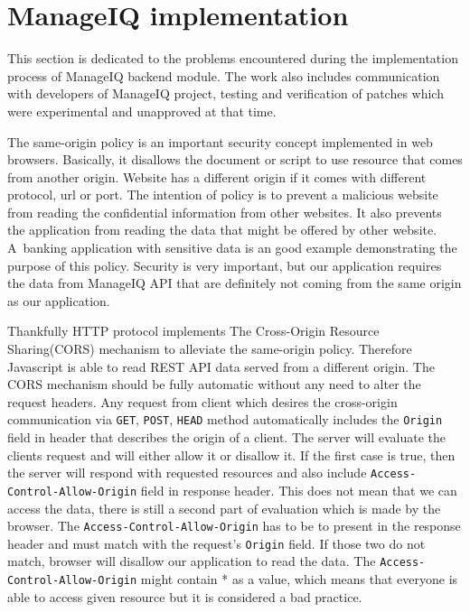 \section{ManageIQ implementation}
This section is dedicated to the problems encountered during the implementation process of ManageIQ backend module. The work also includes communication with developers of ManageIQ project, testing and verification of patches which were experimental and unapproved at that time.

The same-origin policy \cite{policy} is an important security concept implemented in web browsers. Basically, it disallows the document or script to use resource that comes from another origin. Website has a different origin if it comes with different protocol, url or port. The intention of policy is to prevent a malicious website from reading the confidential information from other websites. It also prevents the application from reading the data that might be offered by other website. A~banking application with sensitive data is an good example demonstrating the purpose of this policy. Security is very important, but our application requires the data from ManageIQ API that are definitely not coming from the same origin as our application.

Thankfully HTTP protocol implements The Cross-Origin Resource Sharing(CORS) \cite{cors} mechanism to alleviate the same-origin policy. Therefore Javascript is able to read REST API data served from a different origin. The CORS mechanism should be fully automatic without any need to alter the request headers. Any request from client which desires the cross-origin communication via \texttt{GET}, \texttt{POST}, \texttt{HEAD} method automatically includes the \texttt{Origin} field in header that describes the origin of a client. The server will evaluate the clients request and will either allow it or disallow it. If the first case is true, then the server will respond with requested resources and also include \texttt{Access-Control-Allow-Origin} field in response header. This does not mean that we can access the data, there is still a second part of evaluation which is made by the browser. The \texttt{Access-Control-Allow-Origin} has to be to present in the response header and must match with the request's \texttt{Origin} field. If those two do not match, browser will disallow our application to read the data. The \texttt{Access-Control-Allow-Origin} might contain * as a value, which means that everyone is able to access given resource but it is considered a bad practice.

